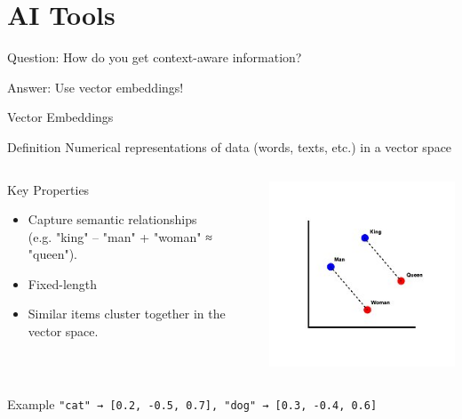 \documentclass[aspectratio=169]{beamer}
\begin{document}
\section{AI Tools}

\begin{frame}
\begin{block}{Question:}
How do you get context-aware information?
\end{block}
\begin{block}{Answer:}
Use vector embeddings!
\end{block}
\end{frame}

\begin{frame}{Vector Embeddings}
  \begin{block}{Definition}
  Numerical representations of data (words, texts, etc.) in a vector space
  \end{block}
  \begin{columns}
  \begin{block}{Key Properties}
  \begin{itemize}
    \item Capture semantic relationships \\(e.g. "king" – "man" + "woman" ≈ "queen").
    \item Fixed-length
    \item Similar items cluster together in the vector space.
  \end{itemize}
  \end{block}
  \includegraphics[width=\linewidth]{Word_vector_illustration}
  \end{columns}
  \begin{block}{Example}
  \texttt{"cat" → [0.2, -0.5, 0.7], "dog" → [0.3, -0.4, 0.6]}
  \end{block}
\end{frame}
\end{document}
